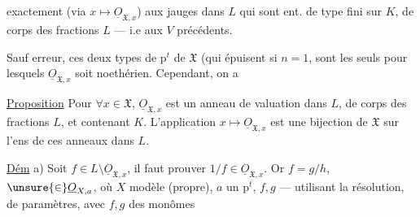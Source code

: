  exactement (via $x\longmapsto\underline{O}_{\mathfrak X,x}$) aux jauges dans $L$ qui sont ent. de type fini sur $K$, de corps des fractions $L$ --- i.e aux $V$ précédents.

Sauf erreur, ces deux types de p$^t$ de $\mathfrak X$ (qui épuisent  si $n=1$, \unsure{)}  sont les seuls pour lesquels $\underline{O}_{\mathfrak X,x}$ soit noethérien. Cependant, on a

\margin{$\big|$}
\uline{Proposition} Pour $\forall x\in\mathfrak X$, $\underline{O}_{\mathfrak X,x}$ est un anneau de valuation dans $L$, de corps des fractions $L$, et contenant $K$. L'application $x\longmapsto\underline{O}_{\mathfrak X,x}$ est une bijection de $\mathfrak X$ sur l'ens de ces anneaux dans $L$.

\uline{Dém} a) Soit $f\in L\setminus\underline{O}_{\mathfrak X,x}$, il faut prouver $1/f\in\underline{O}_{\mathfrak X,x}$. Or $f=g/h$, $\unsure{\in}\underline{O}_{X,a}$, où $X$ modèle  (propre), $a$ un p$^t$, $f,g$  --- utilisant la résolution,   de paramètres, avec $f,g$ des monômes
